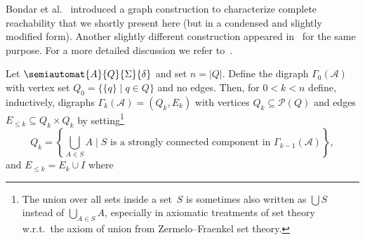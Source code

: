
Bondar et al.~\cite{BondarCV23} introduced
a graph construction to characterize complete reachability
that we shortly present here (but in a condensed and slightly modified form).
Another slightly different construction appeared in~\cite{BondarV18}
for the same purpose.
For a more detailed discussion we refer to~\cite{BondarCV23}.

%
%
%
%
%
% 

\begin{definition} \label{sync_max:def:BVCgraphs}  \label{def:Gammakgraphs}
	Let $\semiautomat{A}{Q}{\Sigma}{\delta}$ and set $n = |Q|$. Define the digraph $\Gamma_0(\mathcal A)$ 
	with vertex set $Q_0 = \{ \{q\} \mid q \in Q \}$ and no edges. Then, for $0 < k < n$
	define, inductively, digraphs $\Gamma_k(\mathcal A) = (Q_k, E_k)$ with
	vertices $Q_k \subseteq \mathcal P(Q)$ and edges $E_{\le k} \subseteq Q_k \times Q_k$
	by setting\footnote{The union over all sets inside a set~$S$ is sometimes also written 
as $\bigcup S$ instead of $\bigcup_{A \in S} A$, especially in axiomatic treatments of set theory w.r.t.~the axiom of union
from Zermelo–Fraenkel set theory.}
	\[
	Q_k = \left\{ \bigcup_{A \in S} A \mid S \text{ is a strongly connected component in } \Gamma_{k-1}(\mathcal A) \right\},
	\]
	and $E_{ \le k} = E_k \cup I$ where

\end{definition}
